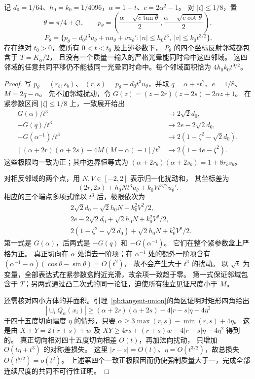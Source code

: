 \begin{lemma}[沿侧弧一致的四邻域证书]\label{pb:arc-circuits}
记 $d_0=1/64$、$h_0=k_0=1/4096$，$\alpha=1-t$、$c=2\alpha^2-1$。
对 $|\zeta|\le1/8$，置
\[
 \theta=\pi/4+\zeta t,\qquad
 p_\theta=\left(\frac{\alpha-\sqrt{c\tan\theta}}2,
                   \frac{\alpha-\sqrt{c\cot\theta}}2\right),
\]
\[
 P_\theta=\{p_\theta-d_0t^3u_\theta+n u_\theta+v u_\theta':
 |n|\le h_0t^3,\ |v|\le k_0t^{3/2}\}.
\]
存在绝对 $t_0>0$，使所有 $0<t<t_0$ 及上述参数下，
$P_\theta$ 的四个坐标反射邻域都包含于 $T=\overline K_\alpha/2$，
且没有一个质量一输入的严格光晕能同时命中这四邻域。
这四邻域的任意共同平移仍不能被同一光晕同时命中。每个邻域面积恰为 $4h_0k_0t^{9/2}$。
\end{lemma}
\begin{proof}
写 $p_\theta=(r_b,s_b)$、
$(r,s)=p_\theta-d_0t^3u_\theta$，并取 $q=\alpha+et^2$、$e=1/8$、$M=2q-\alpha$。
先不加邻域扰动，令
$G(z)=(z-2r)(z-2s)-2\alpha z+1$。
在紧参数区间 $|\zeta|\le1/8$ 上，一致展开给出
\begin{align*}
 G(\alpha)/t^3&\longrightarrow2\sqrt2d_0,\\
 -G(q)/t^3&\longrightarrow2e-2\sqrt2d_0,\\
 -G(\alpha^{-1})/t^3&\longrightarrow2(1-\zeta^2-\sqrt2d_0),\\
 [(\alpha+2r)(\alpha+2s)-4M(M-\alpha)-1]/t^2
 &\longrightarrow2(1-4e-\zeta^2).
\end{align*}
这些极限均一致为正；其中边界恒等式为
$(\alpha+2r_b)(\alpha+2s_b)=1+8r_bs_b$。

对相反邻域的两个点，用 $N,V\in[-2,2]$ 表示归一化扰动和，
其坐标差为
\[
 (2r,2s)+h_0Nt^3u_\theta+k_0Vt^{3/2}u_\theta'.
\]
相应的三个端点多项式除以 $t^3$ 后，极限依次为
\begin{align*}
 &2\sqrt2d_0-\sqrt2h_0N-k_0^2V^2/2,\\
 &2e-2\sqrt2d_0+\sqrt2h_0N+k_0^2V^2/2,\\
 &2(1-\zeta^2-\sqrt2d_0)+\sqrt2h_0N+k_0^2V^2/2.
\end{align*}
第一式是 $G(\alpha)$，后两式是 $-G(q)$ 和 $-G(\alpha^{-1})$。
它们在整个紧参数盒上严格为正。
真正切向在 $\alpha$ 处消去一阶项；在 $\alpha^{-1}$ 处的额外一阶项含有
$(\alpha^{-1}-\alpha)(\cos\theta-\sin\theta)=O(t^2)$，
故不会产生大于 $t^3$ 的扰动。
以 $\sqrt t$ 为变量，全部表达式在紧参数盒附近光滑，故余项一致趋于零。
第一式保证邻域包含于 $T$；另两式通过凸二次式的同一论证，迫使所有独立见证尺度小于 $M$。

还需核对四小方体的并面积。引理~\ref{pb:tangent-union}的角区证明对矩形四角给出
\[
 |\cup_iQ_\alpha(x_i)|\ge
 (\alpha+2r)(\alpha+2s)-4|r-s|\eta-4\eta^2
\]
于四十五度切向幅度 $\eta$ 的情形，只要
$\alpha\ge3\max(r,s)-\min(r,s)+4\eta$。
这是由 $X+Y=2(r+s)+w$ 及
$XY\ge4rs+(r+s)w-4|r-s|\eta-4\eta^2$ 得到的。
真正切向相对四十五度切向相差 $O(t)$，再加法向扰动，
只增加 $O(t\eta+t^3)$ 的对称差损失。
这里 $|r-s|=O(t)$、$\eta=O(t^{3/2})$，故总损失 $O(t^{5/2})=o(t^2)$。
上述第四个一致正极限因而仍使强制质量大于一，完成全部连续尺度的共同不可行性证明。
\end{proof}


